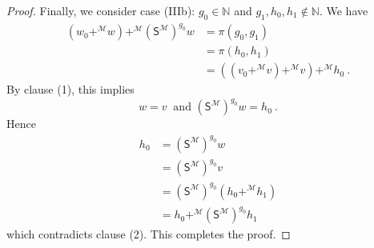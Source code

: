 \documentclass[10pt,a4paper, openany,  oldfontcommands]{memoir}
\newtheorem{open problem} [theorem] {Open Problem}
\newtheorem{open question} [theorem] {Open Question}
\renewcommand{\mathrm}{\mathsf}
\begin{document}
\begin{proof}
Finally, we consider case (IIIb):    $ g_0  \in  \mathbb{N} $  and  $   g_1, h_0 , h_1  \not\in  \mathbb{N}  $. 
We have  
\begin{align*}
    \left( w_0   +^{  \mathcal{M} }  w   \right)     +^{  \mathcal{M} }    \left(  \mathrm{S}^{   \mathcal{M} }  \right)^{ g_0 }  w 
&=    \pi   ( g_0, g_1)  
\\
&  =   \pi   (h_0, h_1) 
\\
&=   \left( \left( v_0   +^{  \mathcal{M} }  v   \right)     +^{  \mathcal{M} }   v   \right)    +^{  \mathcal{M} }   h_0  
\      .
\end{align*}
By clause (1),  this implies  
\[
 w  = v  
 \    \mbox{  and  }  
 \left(  \mathrm{S}^{   \mathcal{M} }  \right)^{ g_0 }  w   =  h_0 
 \     .
\]
Hence 
\begin{align*}
h_0   &= 
 \left(  \mathrm{S}^{   \mathcal{M} }  \right)^{  g_0 }   w  
 \\
  &= 
 \left(  \mathrm{S}^{   \mathcal{M} }  \right)^{  g_0 }   v
 \\
 &=    \left(  \mathrm{S}^{   \mathcal{M} }  \right)^{  g_0 }   \left(  h_0  +^{  \mathcal{M}  }   h_1   \right) 
 \\
 &= 
 h_0      +^{  \mathcal{M}  }     \left( \mathrm{S}^{   \mathcal{M} }  \right)^{  g_0 }    h_1
\end{align*}
which contradicts clause (2). 
This completes the proof. 
\end{proof}
\end{document}

